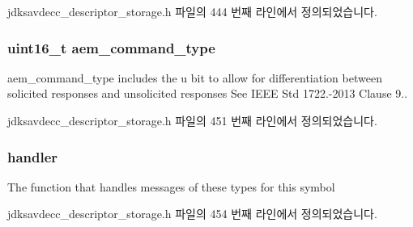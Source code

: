 jdksavdecc\+\_\+descriptor\+\_\+storage.\+h 파일의 444 번째 라인에서 정의되었습니다.

\subsubsection[{\texorpdfstring{aem\+\_\+command\+\_\+type}{aem_command_type}}]{\setlength{\rightskip}{0pt plus 5cm}uint16\+\_\+t aem\+\_\+command\+\_\+type}\hypertarget{structjdksavdecc__descriptor__storage__symbol__dispatch__item_ac7453e2a1b6d4303571f709c46750bf1}{}\label{structjdksavdecc__descriptor__storage__symbol__dispatch__item_ac7453e2a1b6d4303571f709c46750bf1}
aem\+\_\+command\+\_\+type includes the \textquotesingle{}u\textquotesingle{} bit to allow for differentiation between solicited responses and unsolicited responses See I\+E\+EE Std 1722.-\/2013 Clause 9.. 

jdksavdecc\+\_\+descriptor\+\_\+storage.\+h 파일의 451 번째 라인에서 정의되었습니다.

\subsubsection[{\texorpdfstring{handler}{handler}}]{ handler}\hypertarget{structjdksavdecc__descriptor__storage__symbol__dispatch__item_a7c652fe3a5cea7f258279784cf74cf36}{}\label{structjdksavdecc__descriptor__storage__symbol__dispatch__item_a7c652fe3a5cea7f258279784cf74cf36}
The function that handles messages of these types for this symbol 

jdksavdecc\+\_\+descriptor\+\_\+storage.\+h 파일의 454 번째 라인에서 정의되었습니다.

